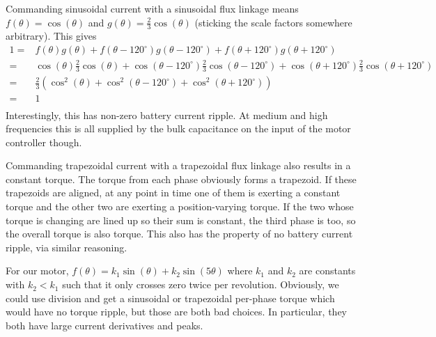 \documentclass[fleqn]{article}
\begin{document}
\begin{flushleft}
Commanding sinusoidal current with a sinusoidal flux linkage means
$f(\theta) = \cos(\theta)$ and
$g(\theta) = \frac{2}{3}\cos(\theta)$ (sticking the scale factors somewhere
arbitrary).
This gives
\begin{align*}
  1 =& f(\theta)g(\theta) +
  f(\theta - 120^{\circ})g(\theta - 120^{\circ}) +
  f(\theta + 120^{\circ})g(\theta + 120^{\circ}) \\
  =& \cos(\theta)\frac{2}{3}\cos(\theta) +
  \cos(\theta - 120^{\circ})\frac{2}{3}\cos(\theta - 120^{\circ}) +
  \cos(\theta + 120^{\circ})\frac{2}{3}\cos(\theta + 120^{\circ}) \\
  =& \frac{2}{3}(
  \cos^2(\theta) + \cos^2(\theta - 120^{\circ}) +
  \cos^2(\theta + 120^{\circ})) \\
  =& 1 \\
\end{align*}
Interestingly, this has non-zero battery current ripple. At medium and high
frequencies this is all supplied by the bulk capacitance on the input of the
motor controller though.

Commanding trapezoidal current with a trapezoidal flux linkage also results
in a constant torque.
The torque from each phase obviously forms a trapezoid.
If these trapezoids are aligned, at any point in time one of them is exerting
a constant torque and the other two are exerting a position-varying torque.
If the two whose torque is changing are lined up so their sum is constant,
the third phase is too, so the overall torque is also torque.
This also has the property of no battery current ripple, via similar reasoning.

For our motor,
$f(\theta) = k_1 \sin(\theta) + k_2 \sin(5 \theta)$ where $k_1$ and $k_2$ are
constants with $k_2 < k_1$ such that it only crosses zero twice per revolution.
Obviously, we could use division and get a sinusoidal or trapezoidal
per-phase torque which would have no torque ripple, but those are both
bad choices.
In particular, they both have large current derivatives and peaks.

\end{flushleft}
\end{document}
